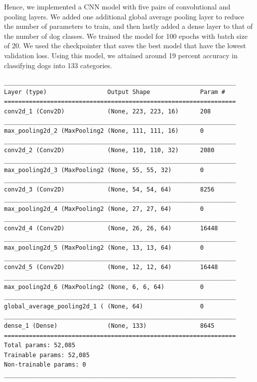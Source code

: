 \documentclass[a4paper]{article}
\begin{document}
Hence, we implemented a CNN model with five pairs of convolutional and pooling layers. We added one additional global average pooling layer to reduce the number of parameters to train, and then lastly added a dense layer to that of the number of dog classes. We trained the model for 100 epochs with batch size of 20. We used the checkpointer that saves the best model that have the lowest validation loss. Using this model, we attained around 19 percent accuracy in classifying dogs into 133 categories.

\begin{verbatim}
_________________________________________________________________
Layer (type)                 Output Shape              Param #   
=================================================================
conv2d_1 (Conv2D)            (None, 223, 223, 16)      208       
_________________________________________________________________
max_pooling2d_2 (MaxPooling2 (None, 111, 111, 16)      0         
_________________________________________________________________
conv2d_2 (Conv2D)            (None, 110, 110, 32)      2080      
_________________________________________________________________
max_pooling2d_3 (MaxPooling2 (None, 55, 55, 32)        0         
_________________________________________________________________
conv2d_3 (Conv2D)            (None, 54, 54, 64)        8256      
_________________________________________________________________
max_pooling2d_4 (MaxPooling2 (None, 27, 27, 64)        0         
_________________________________________________________________
conv2d_4 (Conv2D)            (None, 26, 26, 64)        16448     
_________________________________________________________________
max_pooling2d_5 (MaxPooling2 (None, 13, 13, 64)        0         
_________________________________________________________________
conv2d_5 (Conv2D)            (None, 12, 12, 64)        16448     
_________________________________________________________________
max_pooling2d_6 (MaxPooling2 (None, 6, 6, 64)          0         
_________________________________________________________________
global_average_pooling2d_1 ( (None, 64)                0         
_________________________________________________________________
dense_1 (Dense)              (None, 133)               8645      
=================================================================
Total params: 52,085
Trainable params: 52,085
Non-trainable params: 0
_________________________________________________________________
\end{verbatim}
\end{document}
